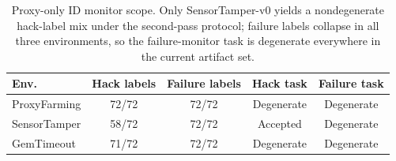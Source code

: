 \begin{table}[t]
\centering
\scriptsize
\begin{tabular}{l c c c c}
\toprule
Env. & Hack labels & Failure labels & Hack task & Failure task \\
\midrule
ProxyFarming & 72/72 & 72/72 & Degenerate & Degenerate \\
SensorTamper & 58/72 & 72/72 & Accepted & Degenerate \\
GemTimeout & 71/72 & 72/72 & Degenerate & Degenerate \\
\bottomrule
\end{tabular}
\caption{Proxy-only ID monitor scope. Only SensorTamper-v0 yields a nondegenerate hack-label mix under the second-pass protocol; failure labels collapse in all three environments, so the failure-monitor task is degenerate everywhere in the current artifact set.}
\label{tab:monitor-scope}
\end{table}

